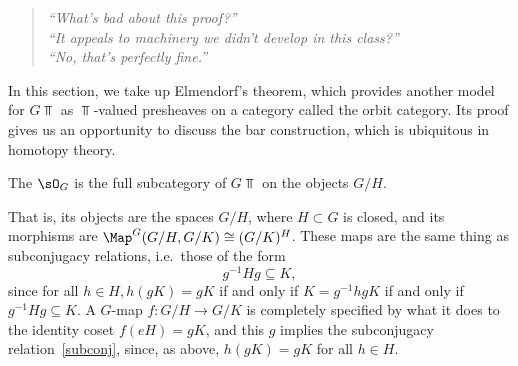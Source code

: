 
\begin{quote}\textit{
	``What's bad about this proof?''\\
	``It appeals to machinery we didn't develop in this class?''\\
	``No, that's perfectly fine.''
}\end{quote}

In this section, we take up Elmendorf's theorem, which provides another model for $G\Top$ as $\Top$-valued
presheaves on a category called the orbit category. Its proof gives us an opportunity to discuss the bar
construction, which is ubiquitous in homotopy theory.
\begin{defn}
The  $\sO_G$ is the full subcategory of $G\Top$ on the objects $G/H$.
\end{defn}
That is, its objects are the spaces $G/H$, where $H\subset G$ is closed, and its morphisms are $\Map^G(G/H,
G/K)\cong (G/K)^H$. These maps are the same thing as subconjugacy relations, i.e.\ those of the form
\begin{equation}
\label{subconj}
g^{-1}Hg\subseteq K,
\end{equation}
since for all $h \in H, h(gK) = gK$ if and only if $K = g^{-1}hgK$ if and only if $g^{-1}Hg \subseteq K$. A
$G$-map $f\colon G/H\to G/K$ is completely specified by what it does to the identity coset $f(eH) = gK$, and this
$g$ implies the subconjugacy relation~\eqref{subconj}, since, as above, $h(gK) = gK$ for all $h \in
H$.

